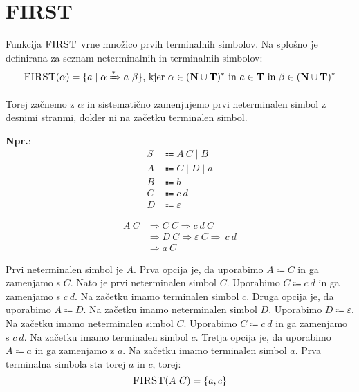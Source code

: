 \documentclass{article}
\newcommand{\Ex}{\textbf{Npr.}:\ }
\newcommand{\FIRST}{\textsc{FIRST}}
\newcommand{\Set}[1]{\mathbf{#1}}
\newcommand{\Terminals}{\Set{T}}
\newcommand{\NonTerminals}{\Set{N}}
\newcommand{\Null}{\varepsilon}
\newcommand{\Arrow}{\Coloneqq}
\newcommand{\Derive}{\Rightarrow}
\newcommand{\DeriveStar}{\xRightarrow{\ast}}
\newcommand{\Seq}{\ }
\newcommand{\Union}{\mathrel{|}}
\newcommand{\Kleene}[1]{#1^\ast}
\begin{document}
\section{\FIRST}


Funkcija $\FIRST$ vrne množico prvih terminalnih simbolov.
Na splošno je definirana za seznam neterminalnih in terminalnih simbolov:
\begin{equation*}
  \FIRST(\alpha) = \{ a \mid \alpha \DeriveStar a \Seq \beta \} \text{, kjer } \alpha \in \Kleene{(\NonTerminals \cup \Terminals)} \text{ in } a \in \Terminals \text{ in } \beta \in \Kleene{(\NonTerminals \cup \Terminals)}
\end{equation*}

Torej začnemo z $\alpha$ in sistematično zamenjujemo prvi neterminalen simbol z desnimi stranmi, dokler ni na začetku terminalen simbol.

\Ex
\begin{equation*}
  \begin{aligned}
    S &\Arrow A \Seq C \Union B \\
    A &\Arrow C \Union D \Union a \\
    B &\Arrow b\\
    C &\Arrow c \Seq d\\
    D &\Arrow \Null
  \end{aligned}
\end{equation*}

\begin{align*}
  A \Seq C &\Derive C \Seq C \Derive c \Seq d \Seq C \\
           &\Derive D \Seq C \Derive \Null \Seq C \Derive \Seq c \Seq d \\
           &\Derive a \Seq C
\end{align*}

Prvi neterminalen simbol je $A$.
Prva opcija je, da uporabimo $A \Arrow C$ in ga zamenjamo s $C$.
Nato je prvi neterminalen simbol $C$.
Uporabimo $C \Arrow c \Seq d$ in ga zamenjamo s $c \Seq d$.
Na začetku imamo terminalen simbol $c$.
Druga opcija je, da uporabimo $A \Arrow D$.
Na začetku imamo neterminalen simbol $D$.
Uporabimo $D \Arrow \Null$.
Na začetku imamo neterminalen simbol $C$.
Uporabimo $C \Arrow c \Seq d$ in ga zamenjamo s $c \Seq d$.
Na začetku imamo terminalen simbol $c$.
Tretja opcija je, da uporabimo $A \Arrow a$ in ga zamenjamo z $a$.
Na začetku imamo terminalen simbol $a$.
Prva terminalna simbola sta torej $a$ in $c$, torej:
\begin{equation*}
  \FIRST(A \Seq C) = \{a, c\}
\end{equation*}
\end{document}
